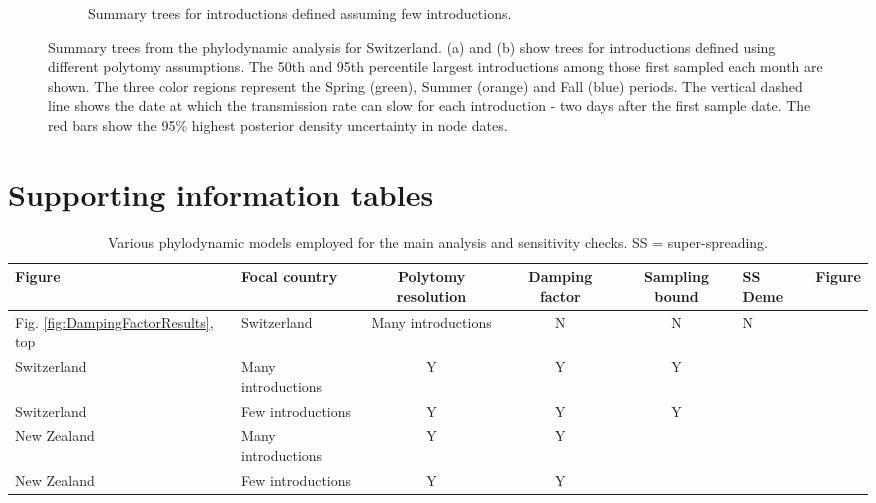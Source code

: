 \documentclass[9pt,twoside,lineno]{pnas-new}
\begin{document}
\begin{landscape}
\begin{figure}[H]
\begin{subfigure}[b]{0.65\textwidth}
\caption{Summary trees for introductions defined assuming few introductions.}
\end{subfigure}
\caption{Summary trees from the phylodynamic analysis for Switzerland. (a) and (b) show trees for introductions defined using different polytomy assumptions. The 50th and 95th percentile largest introductions among those first sampled each month are shown. The three color regions represent the Spring (green), Summer (orange) and Fall (blue) periods. The vertical dashed line shows the date at which the transmission rate can slow for each introduction - two days after the first sample date. The red bars show the 95\% highest posterior density uncertainty in node dates.}  
\label{fig:logged-chains-max}
\end{figure}
\end{landscape}
\newpage

\section{Supporting information tables}

\begin{table}[H]
\centering
\caption{Various phylodynamic models employed for the main analysis and sensitivity checks. SS = super-spreading.}
\label{tab:phylo-models}
\begin{tabular}{llccc}
\hline
Figure & Focal country & Polytomy resolution & Damping factor & Sampling bound & SS Deme & Figure \\
\hline
Fig. \ref{fig:DampingFactorResults}, top & Switzerland & Many introductions & N & N & N \\
Switzerland & Many introductions & Y & Y & Y \\
Switzerland & Few introductions & Y & Y & Y \\
New Zealand & Many introductions & Y & Y & \\
New Zealand & Few introductions & Y & Y & \\
\hline
\end{tabular}
\newline
\end{table}
\end{document}

